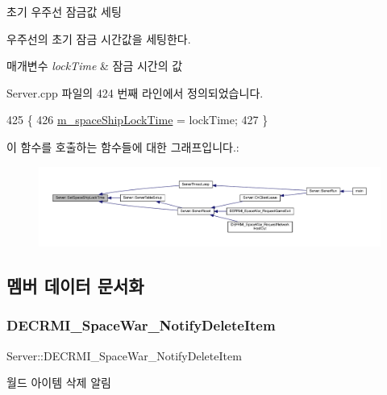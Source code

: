 초기 우주선 잠금값 세팅 

우주선의 초기 잠금 시간값을 세팅한다.


\begin{DoxyParams}{매개변수}
{\em lock\+Time} & 잠금 시간의 값 \\
\hline
\end{DoxyParams}


Server.\+cpp 파일의 424 번째 라인에서 정의되었습니다.


\begin{DoxyCode}
425 \{
426     \hyperlink{class_server_a21ee3e9152293a6e6d47fd569ee3f37a}{m\_spaceShipLockTime} = lockTime;
427 \}
\end{DoxyCode}
이 함수를 호출하는 함수들에 대한 그래프입니다.\+:\nopagebreak
\begin{figure}[H]
\begin{center}
\leavevmode
\includegraphics[width=350pt]{class_server_a3866f3d6a99358d0068cee3d5bc529d2_icgraph}
\end{center}
\end{figure}


\subsection{멤버 데이터 문서화}
\mbox{\label{class_server_a08505a5d3bef878c63f07bd5597c6782}} 
\subsubsection{\texorpdfstring{D\+E\+C\+R\+M\+I\+\_\+\+Space\+War\+\_\+\+Notify\+Delete\+Item}{DECRMI\_SpaceWar\_NotifyDeleteItem}}
{\footnotesize\ttfamily Server\+::\+D\+E\+C\+R\+M\+I\+\_\+\+Space\+War\+\_\+\+Notify\+Delete\+Item}



월드 아이템 삭제 알림 



